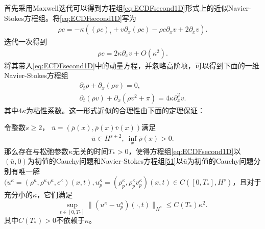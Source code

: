 首先采用Maxwell迭代可以得到方程组\eqref{eq:ECDFsecond1D}形式上的近似Navier-Stokes方程组。将\eqref{eq:ECDFsecond1D}写为
\begin{eqnarray*}
 \rho c= -\kappa(( \rho c)_t + v \partial_x (\rho c) -  \rho c \partial_x v + 2 \partial_x v).
\end{eqnarray*}
迭代一次得到
\begin{eqnarray*}
  \rho c = 2 \kappa \partial_x v + O(\kappa^2).
\end{eqnarray*}
将其带入\eqref{eq:ECDFsecond1D}中的动量方程，并忽略高阶项，可以得到下面的一维Navier-Stokes方程组
\begin{align}\label{51}
  \partial_t \rho + \partial_x (\rho v ) = 0, \nonumber \\
  \partial_t (\rho v) + \partial_x( \rho v^2 + \pi) = 4 \kappa \partial^2_x v.
\end{align}
其中$4\kappa$为粘性系数。这一形式近似的合理性由下面的定理保证：
\begin{theorem}\label{theoremCE}
令整数$s \ge 2$， ${\bar u} =({\bar \rho}(x),\bar{\rho}(x){\bar v}(x))$满足
  \begin{eqnarray*}
    \bar{u}\in H^{s+2},\ \inf_{x} \bar{\rho}(x)>0.
 \end{eqnarray*}
那么存在与松弛参数$\kappa$无关的时间$T_*>0$，使得方程组\eqref{eq:ECDFsecond1D}以$(\bar{u},0)$为初值的Cauchy问题和Navier-Stokes方程组\eqref{51}以${\bar u}$为初值的Cauchy问题分别有唯一解$(u^\kappa=(\rho^\kappa,\rho^\kappa v^\kappa, c^\kappa)(x,t),u^\kappa_p=(\rho^\kappa_p,\rho^\kappa_p v^\kappa_p)(x,t) \in C([0,T_*], H^s)$，且对于充分小的$\kappa$，它们满足
  \begin{equation}\label{52}
    \sup_{t \in [0, T_*]} \|(u^\kappa-u^\kappa_p)(\cdot,t)\|_{H^s} \le C(T_*) \kappa^2.
  \end{equation}
 其中$C(T_*)>0$不依赖于$\kappa$。
\end{theorem}

